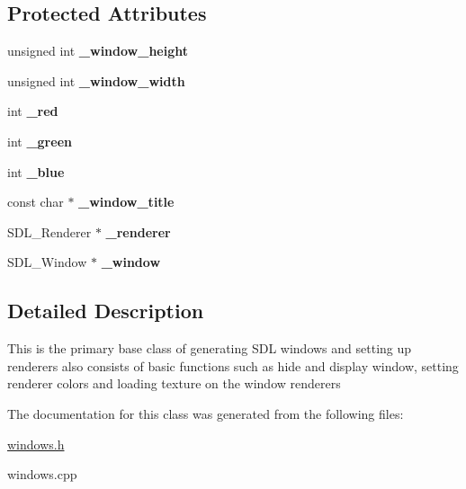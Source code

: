 \subsection*{Protected Attributes}
\begin{DoxyCompactItemize}
\item 
\hypertarget{class_s_d_l_window_acc157932676ffcb867e6a310d0dbf69b}{}\label{class_s_d_l_window_acc157932676ffcb867e6a310d0dbf69b} 
unsigned int {\bfseries \+\_\+window\+\_\+height}
\item 
\hypertarget{class_s_d_l_window_acd0639d5ba847c6fdffa9670678e0b4f}{}\label{class_s_d_l_window_acd0639d5ba847c6fdffa9670678e0b4f} 
unsigned int {\bfseries \+\_\+window\+\_\+width}
\item 
\hypertarget{class_s_d_l_window_a56b01157b3545f359a0beff63d5d404c}{}\label{class_s_d_l_window_a56b01157b3545f359a0beff63d5d404c} 
int {\bfseries \+\_\+red}
\item 
\hypertarget{class_s_d_l_window_a8290094b34e41442814cdde78f8be0d8}{}\label{class_s_d_l_window_a8290094b34e41442814cdde78f8be0d8} 
int {\bfseries \+\_\+green}
\item 
\hypertarget{class_s_d_l_window_a137c54559f64208948d607d915e3b3ef}{}\label{class_s_d_l_window_a137c54559f64208948d607d915e3b3ef} 
int {\bfseries \+\_\+blue}
\item 
\hypertarget{class_s_d_l_window_ad56f59226f814417588bd183b3d95ec7}{}\label{class_s_d_l_window_ad56f59226f814417588bd183b3d95ec7} 
const char $\ast$ {\bfseries \+\_\+window\+\_\+title}
\item 
\hypertarget{class_s_d_l_window_a5d019d10d5b118d1436601d28648395a}{}\label{class_s_d_l_window_a5d019d10d5b118d1436601d28648395a} 
S\+D\+L\+\_\+\+Renderer $\ast$ {\bfseries \+\_\+renderer}
\item 
\hypertarget{class_s_d_l_window_a9837fbcefc8e6fc41b11d44964c79cf2}{}\label{class_s_d_l_window_a9837fbcefc8e6fc41b11d44964c79cf2} 
S\+D\+L\+\_\+\+Window $\ast$ {\bfseries \+\_\+window}
\end{DoxyCompactItemize}


\subsection{Detailed Description}
This is the primary base class of generating S\+DL windows and setting up renderers also consists of basic functions such as hide and display window, setting renderer colors and loading texture on the window renderers 

The documentation for this class was generated from the following files\+:\begin{DoxyCompactItemize}
\item 
\hyperlink{windows_8h}{windows.\+h}\item 
windows.\+cpp\end{DoxyCompactItemize}
